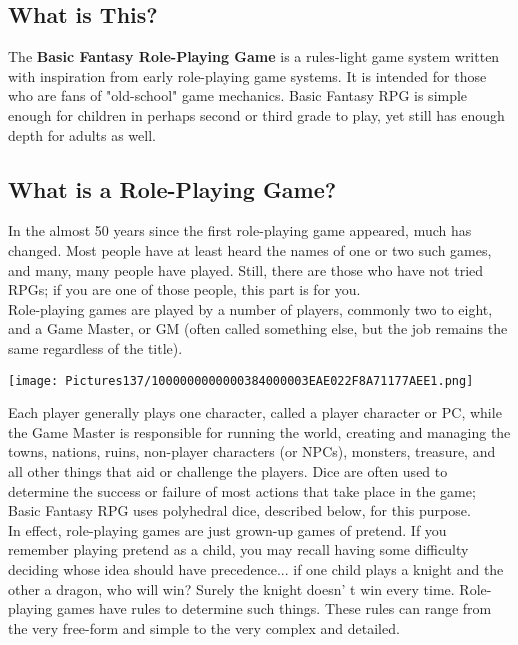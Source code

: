 \documentclass[a4paper,twoside,openany,10pt]{book}
\begin{document}
\begin{multicols}{2}

\subsection{What is This?}\label{what-is-this}

The \textbf{Basic Fantasy Role-Playing Game} is a rules-light game system written with inspiration from early role-playing game systems. It is intended for those who are fans of "old-school" game mechanics. Basic Fantasy RPG is simple enough for children in perhaps second or third
grade to play, yet still has enough depth for adults as well. 

\subsection{What is a Role-Playing Game?}\label{what-is-a-role-playing-game}

In the almost 50 years since the first role-playing game appeared, much has changed. Most people have at least heard the names of one or two such games, and many, many people have played. Still, there are those who have not tried RPGs; if you are one of those people, this part is for you.\\

Role-playing games are played by a number of players, commonly two to eight, and a Game Master, or GM (often called something else, but the job remains the same regardless of the title). 

\texttt{[image: Pictures137/1000000000000384000003EAE022F8A71177AEE1.png]}

Each player generally plays one character, called a player character or PC, while the Game Master is responsible for running the world, creating and managing the towns, nations, ruins, non-player characters (or NPCs), monsters, treasure, and all other things that aid or challenge the players. Dice are often used to determine the success or failure of most actions that take place in the game; Basic Fantasy RPG uses polyhedral dice, described below, for this purpose.\\

In effect, role-playing games are just grown-up games of pretend. If you remember playing pretend as a child, you may recall having some difficulty deciding whose idea should have precedence... if one child plays a knight and the other a dragon, who will win? Surely the knight doesn' t win every time. Role-playing games have rules to determine such things. These rules can range from the very free-form and simple to the very complex and detailed.


\end{multicols}
\end{document}
